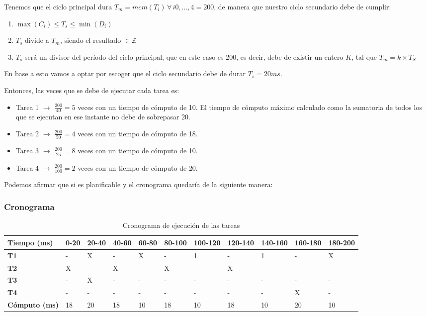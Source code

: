 \documentclass[a4paper,12pt]{article}
\begin{document}
Tenemos que el ciclo principal dura $T_m = mcm(T_i)\,\forall \, i 0,\ldots, 4 = 200$, de manera que nuestro ciclo secundario debe de cumplir:
\begin{enumerate}
    \item $\max(C_i) \leq T_s \leq \min(D_i)$
    \item $T_s$ divide a $T_m$, siendo el resultado $\in \mathbb{Z}$
    \item $T_s$ será un divisor del período del ciclo principal, que en este caso es 200, es decir, debe de existir un entero $K$, tal que $T_m = k \times T_S$
\end{enumerate}

En base a esto vamos a optar por escoger que el ciclo secundario debe de durar $T_s=20ms$.

Entonces, las veces que se debe de ejecutar cada tarea es:
\begin{itemize}
    \item Tarea 1 $\rightarrow$ $\frac{200}{40} = 5$ veces con un tiempo de cómputo de 10. El tiempo de cómputo máximo calculado como la sumatoria de todos los que se ejecutan en ese instante no debe de sobrepasar 20. 
    \item Tarea 2 $\rightarrow$ $\frac{200}{50} = 4$ veces con un tiempo de cómputo de 18.
    \item Tarea 3 $\rightarrow$ $\frac{200}{25} = 8$ veces con un tiempo de cómputo de 10.
    \item Tarea 4 $\rightarrow$ $\frac{200}{100} = 2$ veces con un tiempo de cómputo de 20.
\end{itemize}


Podemos afirmar que si es planificable y el cronograma quedaría de la siguiente manera:



\subsubsection{Cronograma}



\begin{table}[H]
    \centering
    \begin{tabular}{|p{1.6cm}|p{1.2cm}|p{1.2cm}|p{1.2cm}|p{1.2cm}|p{1.2cm}|p{1.2cm}|p{1.2cm}|p{1.2cm}|p{1.2cm}|p{1.2cm}|}
    \hline
    \textbf{Tiempo (ms)} & 0-20 & 20-40 & 40-60 & 60-80 & 80-100 & 100-120 & 120-140 & 140-160 & 160-180 & 180-200 \\ \hline
    \textbf{T1} & - & X & - & X & - & 1 & - & 1 & - & X \\ \hline
    \textbf{T2} & X & - & X & - & X & - & X & - & - & - \\ \hline
    \textbf{T3} & - & X & - & - & - & - & - & - & - & - \\ \hline
    \textbf{T4} & - & - & - & - & - & - & - & - & X & - \\ \hline
    \textbf{Cómputo (ms)} & 18 & 20 & 18 & 10 & 18 & 10 & 18 & 10 & 20 & 10 \\ \hline
    \end{tabular}
    \caption{Cronograma de ejecución de las tareas}
\end{table}
    
\end{document}
